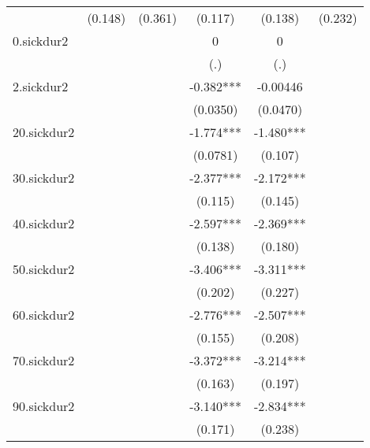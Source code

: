 \begin{table}[htbp]
\begin{tabular}{l*{5}{c}}
            &     (0.148)   &     (0.361)   &     (0.117)   &     (0.138)   &     (0.232)   \\
[1em]
0.sickdur2  &               &               &           0   &           0   &               \\
            &               &               &         (.)   &         (.)   &               \\
[1em]
2.sickdur2  &               &               &      -0.382***&    -0.00446   &               \\
            &               &               &    (0.0350)   &    (0.0470)   &               \\
[1em]
20.sickdur2 &               &               &      -1.774***&      -1.480***&               \\
            &               &               &    (0.0781)   &     (0.107)   &               \\
[1em]
30.sickdur2 &               &               &      -2.377***&      -2.172***&               \\
            &               &               &     (0.115)   &     (0.145)   &               \\
[1em]
40.sickdur2 &               &               &      -2.597***&      -2.369***&               \\
            &               &               &     (0.138)   &     (0.180)   &               \\
[1em]
50.sickdur2 &               &               &      -3.406***&      -3.311***&               \\
            &               &               &     (0.202)   &     (0.227)   &               \\
[1em]
60.sickdur2 &               &               &      -2.776***&      -2.507***&               \\
            &               &               &     (0.155)   &     (0.208)   &               \\
[1em]
70.sickdur2 &               &               &      -3.372***&      -3.214***&               \\
            &               &               &     (0.163)   &     (0.197)   &               \\
[1em]
90.sickdur2 &               &               &      -3.140***&      -2.834***&               \\
            &               &               &     (0.171)   &     (0.238)   &               \\

\end{tabular}
\end{table}

